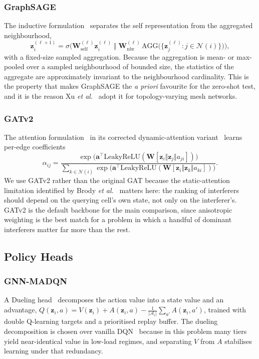 \documentclass[journal]{IEEEtran}
\begin{document}
\subsubsection{GraphSAGE} The inductive
formulation~\cite{hamilton2017graphsage} separates the self
representation from the aggregated neighbourhood,
\begin{equation}
\mathbf{z}_i^{(\ell+1)} = \sigma\Big(
\mathbf{W}_{\mathrm{self}}^{(\ell)}\mathbf{z}_i^{(\ell)}
\;\Vert\;
\mathbf{W}_{\mathrm{nbr}}^{(\ell)}\,
\mathrm{AGG}\big(\{\mathbf{z}_j^{(\ell)}: j \in \mathcal{N}(i)\}\big)\Big),
\end{equation}
with a fixed-size sampled aggregation. Because the aggregation is
mean- or max-pooled over a sampled neighbourhood of bounded size, the
statistics of the aggregate are approximately invariant to the
neighbourhood cardinality. This is the property that makes GraphSAGE
the \emph{a priori} favourite for the zero-shot test, and it is the
reason Xu \emph{et al.}~\cite{xu2026graphsage} adopt it for
topology-varying mesh networks.

\subsubsection{GATv2} The attention
formulation~\cite{velickovic2018gat} in its corrected dynamic-attention
variant~\cite{brody2022gatv2} learns per-edge coefficients
\begin{equation}
\alpha_{ij} = \frac{\exp\!\big(\mathbf{a}^{\!\top}\mathrm{LeakyReLU}(
\mathbf{W}[\mathbf{z}_i \Vert \mathbf{z}_j \Vert a_{ji}])\big)}
{\sum_{k \in \mathcal{N}(i)}
\exp\!\big(\mathbf{a}^{\!\top}\mathrm{LeakyReLU}(
\mathbf{W}[\mathbf{z}_i \Vert \mathbf{z}_k \Vert a_{ki}])\big)}.
\end{equation}
We use GATv2 rather than the original GAT because the static-attention
limitation identified by Brody \emph{et al.}~\cite{brody2022gatv2}
matters here: the ranking of interferers should depend on the querying
cell's own state, not only on the interferer's. GATv2 is the default
backbone for the main comparison, since anisotropic weighting is the
best match for a problem in which a handful of dominant interferers
matter far more than the rest.

\subsection{Policy Heads}
\subsubsection{GNN-MADQN} A Dueling
head~\cite{wang2016dueling} decomposes the action value into a state
value and an advantage,
$Q(\mathbf{z}_i,a) = V(\mathbf{z}_i) + A(\mathbf{z}_i,a)
- \frac{1}{|\mathcal{A}_i|}\sum_{a'} A(\mathbf{z}_i,a')$,
trained with double Q-learning targets and a prioritised replay buffer.
The dueling decomposition is chosen over vanilla
DQN~\cite{mnih2015dqn} because in this problem many tiers yield
near-identical value in low-load regimes, and separating $V$ from $A$
stabilises learning under that redundancy.
\end{document}
